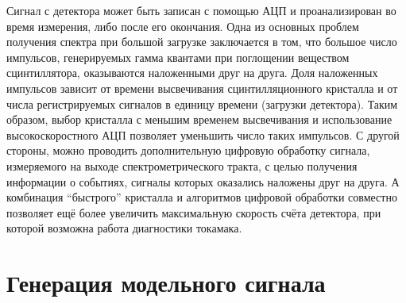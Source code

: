 Сигнал с детектора может быть записан с помощью АЦП и проанализирован во время измерения, либо после его окончания. Одна из основных проблем получения спектра при большой загрузке заключается в том, что большое число импульсов, генерируемых гамма квантами при поглощении веществом сцинтиллятора, оказываются наложенными друг на друга. Доля наложенных импульсов зависит от времени высвечивания сцинтилляционного кристалла и от числа регистрируемых сигналов в единицу времени (загрузки детектора). Таким образом, выбор кристалла с меньшим временем высвечивания и использование высокоскоростного АЦП позволяет уменьшить число таких импульсов. С другой стороны, можно проводить дополнительную цифровую обработку сигнала, измеряемого на выходе спектрометрического тракта, с целью получения информации о событиях, сигналы которых оказались наложены друг на друга. А комбинация ``быстрого'' кристалла и алгоритмов цифровой обработки совместно позволяет ещё более увеличить максимальную скорость счёта детектора, при которой возможна работа диагностики токамака.





\section{Генерация модельного сигнала}
\label{sec:SignalGeneration}

